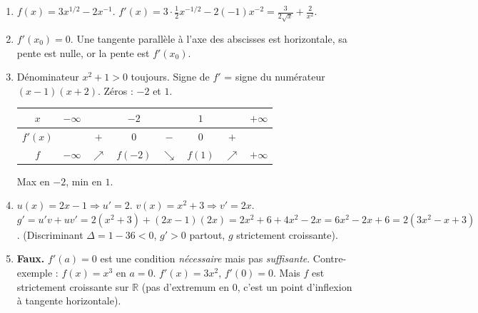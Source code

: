 \documentclass[11pt]{article}
\begin{document}
\begin{corrige}
\begin{enumerate}
    \item $f(x) = 3x^{1/2} - 2x^{-1}$.
    $f'(x) = 3 \cdot \frac{1}{2}x^{-1/2} - 2(-1)x^{-2} = \frac{3}{2\sqrt{x}} + \frac{2}{x^2}$.
    \item $f'(x_0) = 0$. Une tangente parallèle à l'axe des abscisses est horizontale, sa pente est nulle, or la pente est $f'(x_0)$.
    \item Dénominateur $x^2+1 > 0$ toujours. Signe de $f'$ = signe du numérateur $(x-1)(x+2)$.
    Zéros : $-2$ et $1$.
    \begin{center}
    \begin{tabular}{|c|ccccccc|}\hline
    $x$ & $-\infty$ & & $-2$ & & $1$ & & $+\infty$ \\ \hline
    $f'(x)$ & & $+$ & $0$ & $-$ & $0$ & $+$ & \\ \hline
    $f$ & $-\infty$ & $\nearrow$ & $f(-2)$ & $\searrow$ & $f(1)$ & $\nearrow$ & $+\infty$ \\ \hline
    \end{tabular}
    \end{center}
    Max en $-2$, min en $1$.
    \item $u(x)=2x-1 \Rightarrow u'=2$. $v(x)=x^2+3 \Rightarrow v'=2x$.
    $g' = u'v + uv' = 2(x^2+3) + (2x-1)(2x) = 2x^2+6 + 4x^2-2x = 6x^2 - 2x + 6 = 2(3x^2 - x + 3)$.
    (Discriminant $\Delta = 1 - 36 < 0$, $g'>0$ partout, $g$ strictement croissante).
    \item \textbf{Faux.} $f'(a)=0$ est une condition \emph{nécessaire} mais pas \emph{suffisante}.
    Contre-exemple : $f(x)=x^3$ en $a=0$. $f'(x)=3x^2$, $f'(0)=0$. Mais $f$ est strictement croissante sur $\mathbb{R}$ (pas d'extremum en $0$, c'est un point d'inflexion à tangente horizontale).
\end{enumerate}
\end{corrige}
\end{document}
